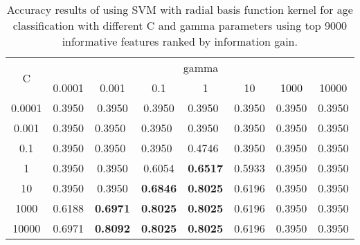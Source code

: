 \documentclass[a4paper]{llncs}
\begin{document}
\begin{table}[!htbp]
\centering
\begin{tabular}{|c|c|c|c|l|l|l|l|}
\hline
\multirow{2}{*}{C} & \multicolumn{7}{c|}{gamma}                                                                                                                                                                          \\ \cline{2-8} 
                   & 0.0001                      & 0.001                       & 0.1                         & \multicolumn{1}{c|}{1} & \multicolumn{1}{c|}{10} & \multicolumn{1}{c|}{1000} & \multicolumn{1}{c|}{10000} \\ \hline
0.0001             & 0.3950                      & 0.3950                      & 0.3950                      & 0.3950                 & 0.3950                  & 0.3950                    & 0.3950                     \\ \hline
0.001              & \multicolumn{1}{l|}{0.3950} & \multicolumn{1}{l|}{0.3950} & \multicolumn{1}{l|}{0.3950} & 0.3950                 & 0.3950                  & 0.3950                    & 0.3950                     \\ \hline
0.1                & \multicolumn{1}{l|}{0.3950} & \multicolumn{1}{l|}{0.3950} & \multicolumn{1}{l|}{0.3950} & 0.4746                 & 0.3950                  & 0.3950                    & 0.3950                     \\ \hline
1                  & 0.3950                      & 0.3950                      & 0.6054                      & \textbf{0.6517}        & 0.5933                  & 0.3950                    & 0.3950                     \\ \hline
10                 & 0.3950                      & 0.3950                      & \textbf{0.6846}             & \textbf{0.8025}        & 0.6196                  & 0.3950                    & 0.3950                     \\ \hline
1000               & 0.6188                      & \textbf{0.6971}             & \textbf{0.8025}             & \textbf{0.8025}        & 0.6196                  & 0.3950                    & 0.3950                     \\ \hline
10000              & 0.6971                      & \textbf{0.8092}             & \textbf{0.8025}             & \textbf{0.8025}        & 0.6196                  & 0.3950                    & 0.3950                     \\ \hline
\end{tabular}
\caption{Accuracy results of using SVM with radial basis function kernel for age classification with different C and gamma parameters using top 9000 informative features ranked by information gain.}
\label{table:SVMRBFAge}
\end{table}
\end{document}
